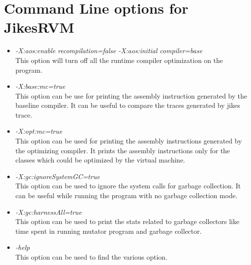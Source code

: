 \documentclass[a4paper]{article}
\begin{document}
\section{Command Line options for JikesRVM}
\begin{itemize}
\item \textit{-X:aos:enable recompilation=false -X:aos:initial compiler=base}\\
This option will turn off all the runtime compiler optimization on the program.
\item \textit{-X:base:mc=true}\\
This option can be use for printing the assembly instruction generated by the baseline
compiler. It can be useful to compare the traces generated by jikes trace.
\item \textit{-X:opt:mc=true}\\
This option can be used for printing the assembly instructions generated by the optimizing
compiler. It prints the assembly instructions only for the classes which could
be optimized by the virtual machine.
\item \textit{-X:gc:ignoreSystemGC=true}\\
This option can be used to ignore the system calls for garbage collection. It can be
useful while running the program with no garbage collection mode.
\item \textit{-X:gc:harnessAll=true}\\
This option can be used to print the stats related to garbage collectors like time spent
in running mutator program and garbage collector.
\item \textit{-help}\\
This option can be used to find the various option.
\end{itemize}
\end{document}
